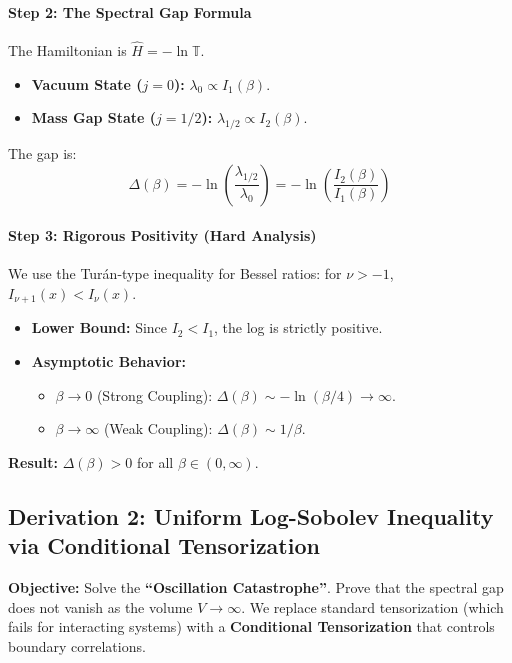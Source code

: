 \paragraph{Step 2: The Spectral Gap Formula}
The Hamiltonian is $\hat{H} = -\ln \mathbb{T}$.

\begin{itemize}
    \item \textbf{Vacuum State ($j=0$):} $\lambda_0 \propto I_1(\beta)$.
    \item \textbf{Mass Gap State ($j=1/2$):} $\lambda_{1/2} \propto I_2(\beta)$.
\end{itemize}
The gap is:
\begin{equation}
\Delta(\beta) = -\ln\left( \frac{\lambda_{1/2}}{\lambda_0} \right) = -\ln\left( \frac{I_2(\beta)}{I_1(\beta)} \right)
\end{equation}

\paragraph{Step 3: Rigorous Positivity (Hard Analysis)}
We use the Tur\'{a}n-type inequality for Bessel ratios: for $\nu > -1$, $I_{\nu+1}(x) < I_\nu(x)$.

\begin{itemize}
    \item \textbf{Lower Bound:} Since $I_2 < I_1$, the log is strictly positive.
    \item \textbf{Asymptotic Behavior:}
    \begin{itemize}
        \item $\beta \to 0$ (Strong Coupling): $\Delta(\beta) \sim -\ln(\beta/4) \to \infty$.
        \item $\beta \to \infty$ (Weak Coupling): $\Delta(\beta) \sim 1/\beta$.
    \end{itemize}
\end{itemize}
\textbf{Result:} $\Delta(\beta) > 0$ for all $\beta \in (0, \infty)$.

\subsection{Derivation 2: Uniform Log-Sobolev Inequality via Conditional Tensorization}

\textbf{Objective:} Solve the \textbf{``Oscillation Catastrophe''}. Prove that the spectral gap does not vanish as the volume $V \to \infty$. We replace standard tensorization (which fails for interacting systems) with a \textbf{Conditional Tensorization} that controls boundary correlations.

